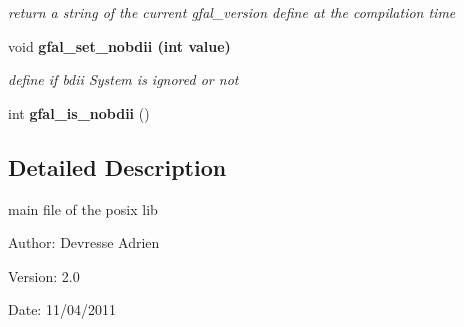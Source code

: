 \begin{CompactItemize}
\begin{CompactList}\small\item\em return a string of the current gfal\_\-version define at the compilation time \item\end{CompactList}\item 
void \bf{gfal\_\-set\_\-nobdii} (int value)
\begin{CompactList}\small\item\em define if bdii System is ignored or not \item\end{CompactList}\item 
int \textbf{gfal\_\-is\_\-nobdii} ()\label{group__internal__group_g0d2a0557bdb571ccb85c6ab5c05ae56f}

\end{CompactItemize}


\subsection{Detailed Description}
main file of the posix lib 

\begin{Desc}
\item[Author:]Devresse Adrien \end{Desc}
\begin{Desc}
\item[Version:]2.0 \end{Desc}
\begin{Desc}
\item[Date:]11/04/2011 \end{Desc}
